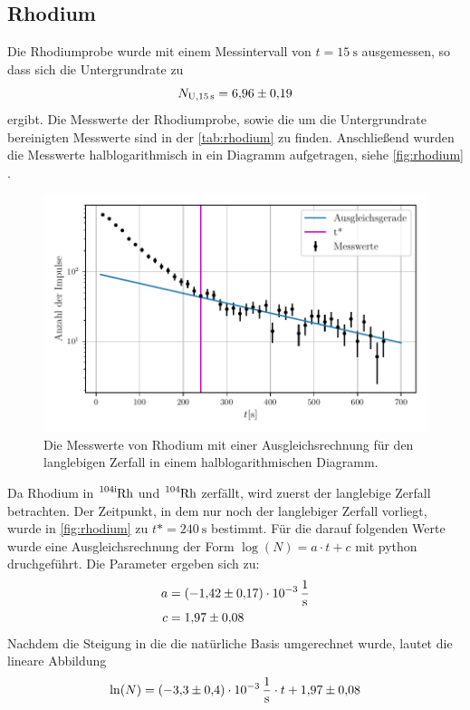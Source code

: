 \subsection{Rhodium}
Die Rhodiumprobe wurde mit einem Messintervall von $t= \SI{15}{\second}$ ausgemessen, so dass sich die Untergrundrate zu 
\begin{equation*}
  N_{\text{U}, \SI{15}{\second}} = \num{6.96\pm 0.19}
\end{equation*}
ergibt.
Die Messwerte der Rhodiumprobe, sowie die um die Untergrundrate bereinigten Messwerte sind in der \autoref{tab:rhodium} zu finden.
Anschließend wurden die Messwerte halblogarithmisch in ein Diagramm aufgetragen, siehe \autoref{fig:rhodium} .
\begin{figure}
  \centering
  \includegraphics[width=\textwidth]{build/rhodium.pdf}
  \caption{Die Messwerte von Rhodium mit einer Ausgleichsrechnung für den langlebigen Zerfall in einem halblogarithmischen Diagramm.}
  \label{fig:rhodium}
\end{figure}
Da Rhodium in $\ce{^{104\text{i}}Rh}$ und $\ce{^{104}Rh}$ zerfällt, wird zuerst der langlebige Zerfall betrachten.
Der Zeitpunkt, in dem nur noch der langlebiger Zerfall vorliegt, wurde in \autoref{fig:rhodium} zu $t* = \SI{240}{\second}$ bestimmt. 
Für die darauf folgenden Werte wurde eine Ausgleichsrechnung der Form $\log(N) = a \cdot t + c $ mit python druchgeführt. 
Die Parameter ergeben sich zu: 
\begin{align*}
  a &= \SI{-1.42(17)e-3}{\per\second}\\
  c &= \num{1.97 \pm 0.08}
\end{align*}
Nachdem die Steigung in die die natürliche Basis umgerechnet wurde, lautet die lineare Abbildung
\begin{equation*}
  \ln(N) = \SI{-3.3(4)e-3}{\per\second} \cdot t + \num{1.97 \pm 0.08}
\end{equation*}
